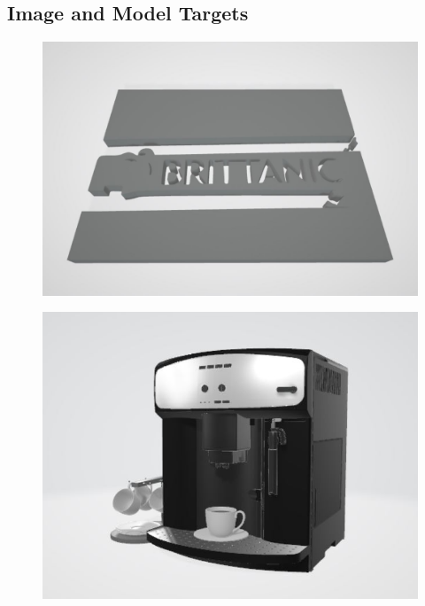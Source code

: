 \documentclass{aifyp}
\begin{document}
\begin{appendices}
\section{Image and Model Targets}
    \begin{figure}[H]
    \centering
        \begin{minipage}{.5\textwidth}
          \centering
          \includegraphics[scale=0.3]{Images/Chapter5/3DObject.JPG}
          \label{fig:test5}
        \end{minipage}%
        \begin{minipage}{.5\textwidth}
          \centering
          \includegraphics[scale=0.3]{Images/Chapter5/CoffeeMachine3DObject.JPG}

\end{minipage}
\end{figure}
\end{appendices}
\end{document}
